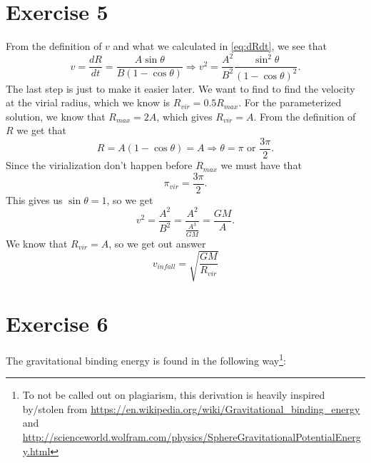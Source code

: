 \documentclass[a4paper,norsk, 10pt]{article}
\begin{document}
\section{Exercise 5}
From the definition of $v$ and what we calculated in \eqref{eq:dRdt}, we see that
\begin{equation}
v = \frac{dR}{dt} = \frac{A\sin\theta}{B(1-\cos \theta)} \Rightarrow v^2 = \frac{A^2}{B^2}\frac{\sin^2 \theta}{(1-\cos \theta)^2}.
\end{equation}
The last step is just to make it easier later. We want to find to find the velocity at the virial radius, which we know is $R_{vir} = 0.5R_{max}$. For the parameterized solution, we know that $R_{max} = 2A$, which gives $R_{vir} = A$. From the definition of $R$ we get that
\begin{equation}
R = A(1-\cos \theta) = A \Rightarrow \theta = \pi \text{ or } \frac{3\pi}{2}. 
\end{equation}
Since the virialization don't happen before $R_{max}$ we must have that
\begin{equation}
\pi_{vir} = \frac{3\pi}{2}.
\end{equation}
This gives us $\sin \theta = 1$, so we get
\begin{equation}
v^2 = \frac{A^2}{B^2} = \frac{A^2}{\frac{A^3}{GM}} = \frac{GM}{A}.
\end{equation}
We know that $R_{vir} = A$, so we get out answer
\begin{equation}
v_{infall} = \sqrt{\frac{GM}{R_{vir}}}
\end{equation}

\section{Exercise 6}
The gravitational binding energy is found in the following way\footnote{To not be called out on plagiarism, this derivation is heavily inspired by/stolen from \url{https://en.wikipedia.org/wiki/Gravitational_binding_energy} and \url{http://scienceworld.wolfram.com/physics/SphereGravitationalPotentialEnergy.html}}:
\end{document}
